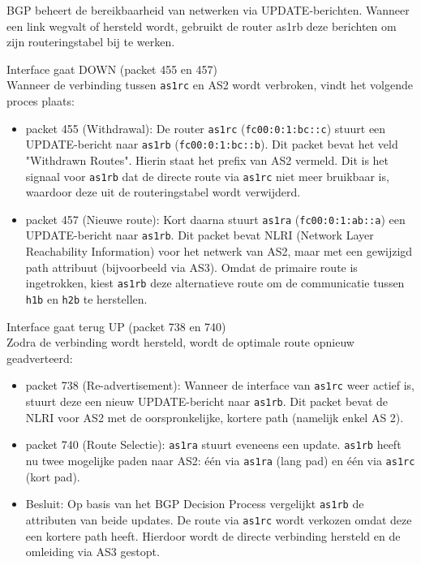 BGP  beheert de bereikbaarheid van netwerken via UPDATE-berichten. Wanneer een link wegvalt of hersteld wordt, gebruikt de router as1rb deze berichten om zijn routeringstabel bij te werken.

Interface gaat DOWN (packet 455 en 457)\\

Wanneer de verbinding tussen \texttt{as1rc} en AS2 wordt verbroken, vindt het volgende proces plaats:

\begin{itemize}
    \item {packet 455 (Withdrawal):} De router \texttt{as1rc} (\texttt{fc00:0:1:bc::c}) stuurt een UPDATE-bericht naar \texttt{as1rb} (\texttt{fc00:0:1:bc::b}). Dit packet bevat het veld {"Withdrawn Routes"}. Hierin staat het prefix van AS2 vermeld. Dit is het signaal voor \texttt{as1rb} dat de directe route via \texttt{as1rc} niet meer bruikbaar is, waardoor deze uit de routeringstabel wordt verwijderd.
    \item {packet 457 (Nieuwe route):} Kort daarna stuurt \texttt{as1ra} (\texttt{fc00:0:1:ab::a}) een UPDATE-bericht naar \texttt{as1rb}. Dit packet bevat {NLRI} (Network Layer Reachability Information) voor het netwerk van AS2, maar met een gewijzigd path attribuut (bijvoorbeeld via AS3). Omdat de primaire route is ingetrokken, kiest \texttt{as1rb} deze alternatieve route om de communicatie tussen \texttt{h1b} en \texttt{h2b} te herstellen.
\end{itemize}

Interface gaat terug UP (packet 738 en 740)\\

Zodra de verbinding wordt hersteld, wordt de optimale route opnieuw geadverteerd:

\begin{itemize}
    \item {packet 738 (Re-advertisement):} Wanneer de interface van \texttt{as1rc} weer actief is, stuurt deze een nieuw UPDATE-bericht naar \texttt{as1rb}. Dit packet bevat de {NLRI} voor AS2 met de oorspronkelijke, kortere path (namelijk enkel AS 2).
    \item {packet 740 (Route Selectie):} \texttt{as1ra} stuurt eveneens een update. \texttt{as1rb} heeft nu twee mogelijke paden naar AS2: één via \texttt{as1ra} (lang pad) en één via \texttt{as1rc} (kort pad).
    \item {Besluit:} Op basis van het {BGP Decision Process} vergelijkt \texttt{as1rb} de attributen van beide updates. De route via \texttt{as1rc} wordt verkozen omdat deze een kortere path heeft. Hierdoor wordt de directe verbinding hersteld en de omleiding via AS3 gestopt.
\end{itemize}